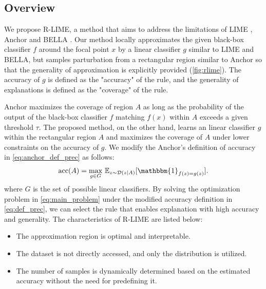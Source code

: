 \documentclass[runningheads]{llncs}
\begin{document}
\subsection{Overview}
We propose R-LIME,
a method that aims to address the limitations of LIME \cite{ribeiro2016why},
Anchor \cite{ribeiro2018anchors} and BELLA \cite{radulovic2023bella}.
Our method locally approximates the given black-box classifier $f$
around the focal point $x$ by a linear classifier $g$ similar to LIME and BELLA,
but samples parturbation from a rectangular region similar to Anchor
so that the generality of approximation is explicitly provided
(\cref{fig:rlime}).
The accuracy of $g$ is defined as the "accuracy" of the rule,
and the generality of explanations is defined as the "coverage" of the rule.

Anchor maximizes the coverage of region $A$
as long as the probability of the output of the black-box classifier $f$ matching $f(x)$
within $A$ exceeds a given threshold $\tau$.
The proposed method, on the other hand, learns an linear classifier $g$
within the rectangular region $A$ and maximizes the coverage of $A$
under lower constraints on the accuracy of $g$.
We modify the Anchor's definition of accuracy in \cref{eq:anchor_def_prec}
as follows:
\begin{equation}
	\Prec(A)=\underset{g\in G}{\max}\ \mathbb{E}_{z\sim\mathcal{D}(z|A)}
	[\mathbbm{1}_{f(z)=g(z)}]. \label{eq:def_prec}
\end{equation}
where $G$ is the set of possible linear classifiers.
By solving the optimization problem in \cref{eq:main_problem}
under the modified accuracy definition in \cref{eq:def_prec},
we can select the rule that enables explanation with high accuracy and generality.
The characteristics of R-LIME are listed below:
\begin{itemize}
	\item The approximation region is optimal and interpretable.
	\item The dataset is not directly accessed, and only the distribution is utilized.
	\item The number of samples is dynamically determined
	      based on the estimated accuracy without the need for predefining it.
\end{itemize}
\end{document}
